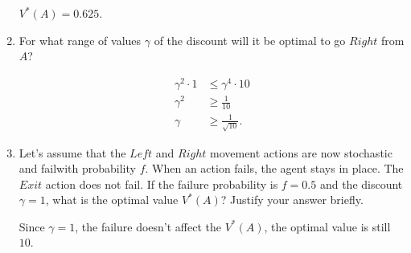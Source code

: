 \documentclass{article}
\begin{document}
\begin{enumerate}[label=(\alph*)]
    $V^*(A) = 0.625$.

    \item For what range of values $\gamma$ of the discount will it be optimal to go $Right$ from $A$?

    \begin{align*}
        \gamma^2 \cdot 1 & \le \gamma^4 \cdot 10 \\
                \gamma^2 & \ge \frac{1}{10} \\
                \gamma   & \ge \frac{1}{\sqrt{10}}.
    \end{align*}

    \item Let's assume that the $Left$ and $Right$ movement actions are now stochastic and failwith probability $f$. When an action fails, the agent stays in place. The $Exit$ action does not fail. If the failure probability is $f = 0.5$ and the discount $\gamma = 1$, what is the optimal value $V^*(A)$? Justify your answer briefly.

    Since $\gamma = 1$, the failure doesn't affect the $V^*(A)$, the optimal value is still $10$.
\end{enumerate}
\end{document}
